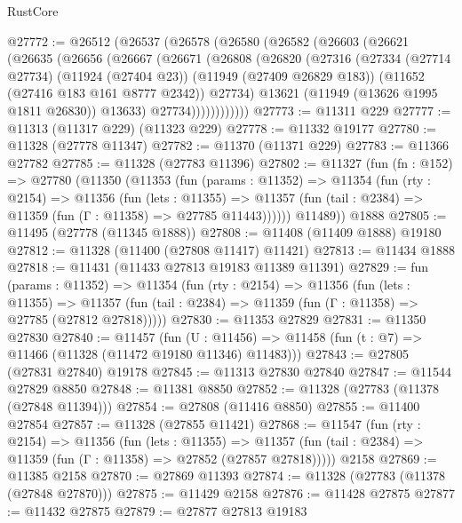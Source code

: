 \begin{lexlean}{RustCore}
\begin{coremodule}
@27772 := @26512
    (@26537
      (@26578
        (@26580
          (@26582
            (@26603
              (@26621
                (@26635
                  (@26656
                    (@26667
                      (@26671
                        (@26808
                          (@26820
                            (@27316
                              (@27334
                                (@27714 @27734)
                                (@11924 (@27404 @23))
                                (@11949 (@27409 @26829 @183))
                                (@11652 (@27416 @183 @161 @8777 @2342))
                                @27734)
                              @13621
                              (@11949 (@13626 @1995 @1811 @26830))
                              @13633)
                            @27734))))))))))))
@27773 := @11311 @229
@27777 := @11313 (@11317 @229) (@11323 @229)
@27778 := @11332 @19177
@27780 := @11328 (@27778 @11347)
@27782 := @11370 (@11371 @229)
@27783 := @11366 @27782
@27785 := @11328 (@27783 @11396)
@27802 := @11327
    (fun (fn : @152) =>
    @27780
      (@11350
        (@11353
          (fun (params : @11352) =>
          @11354
            (fun (rty : @2154) =>
            @11356
              (fun (lets : @11355) =>
              @11357 (fun (tail : @2384) => @11359 (fun (Γ : @11358) => @27785 @11443))))))
        @11489))
    @1888
@27805 := @11495 (@27778 (@11345 @1888))
@27808 := @11408 (@11409 @1888) @19180
@27812 := @11328 (@11400 (@27808 @11417) @11421)
@27813 := @11434 @1888
@27818 := @11431 (@11433 @27813 @19183 @11389 @11391)
@27829 := fun (params : @11352) =>
  @11354
    (fun (rty : @2154) =>
    @11356
      (fun (lets : @11355) =>
      @11357 (fun (tail : @2384) => @11359 (fun (Γ : @11358) => @27785 (@27812 @27818)))))
@27830 := @11353 @27829
@27831 := @11350 @27830
@27840 := @11457
    (fun (U : @11456) => @11458 (fun (t : @7) => @11466 (@11328 (@11472 @19180 @11346) @11483)))
@27843 := @27805 (@27831 @27840) @19178
@27845 := @11313 @27830 @27840
@27847 := @11544 @27829 @8850
@27848 := @11381 @8850
@27852 := @11328 (@27783 (@11378 (@27848 @11394)))
@27854 := @27808 (@11416 @8850)
@27855 := @11400 @27854
@27857 := @11328 (@27855 @11421)
@27868 := @11547
    (fun (rty : @2154) =>
    @11356
      (fun (lets : @11355) =>
      @11357 (fun (tail : @2384) => @11359 (fun (Γ : @11358) => @27852 (@27857 @27818)))))
    @2158
@27869 := @11385 @2158
@27870 := @27869 @11393
@27874 := @11328 (@27783 (@11378 (@27848 @27870)))
@27875 := @11429 @2158
@27876 := @11428 @27875
@27877 := @11432 @27875
@27879 := @27877 @27813 @19183

\end{coremodule}
\end{lexlean}
